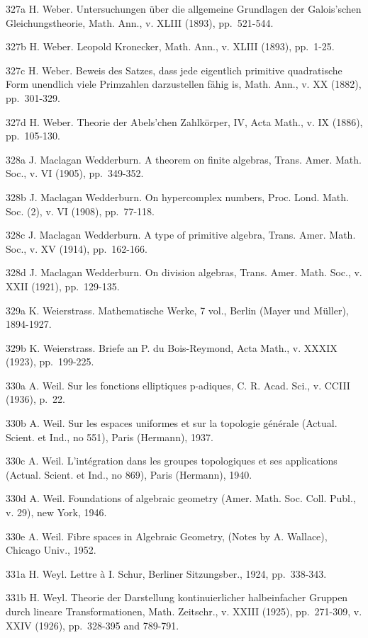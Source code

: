 327a H. Weber. Untersuchungen über die allgemeine Grundlagen der Galois'schen Gleichungstheorie, Math. Ann., v. XLIII (1893), pp.~521-544.

327b H. Weber. Leopold Kronecker, Math. Ann., v. XLIII (1893), pp.~1-25.

327c H. Weber. Beweis des Satzes, dass jede eigentlich primitive quadratische Form unendlich viele Primzahlen darzustellen fähig is, Math. Ann., v. XX (1882), pp.~301-329.

327d H. Weber. Theorie der Abels'chen Zahlkörper, IV, Acta Math., v. IX (1886), pp.~105-130.

328a J. Maclagan Wedderburn. A theorem on finite algebras, Trans. Amer. Math. Soc., v. VI (1905), pp.~349-352.

328b J. Maclagan Wedderburn. On hypercomplex numbers, Proc. Lond. Math. Soc. (2), v. VI (1908), pp.~77-118.

328c J. Maclagan Wedderburn. A type of primitive algebra, Trans. Amer. Math. Soc., v. XV (1914), pp.~162-166.

328d J. Maclagan Wedderburn. On division algebras, Trans. Amer. Math. Soc., v. XXII (1921), pp.~129-135.

329a K. Weierstrass. Mathematische Werke, 7 vol., Berlin (Mayer und Müller), 1894-1927.

329b K. Weierstrass. Briefe an P. du Bois-Reymond, Acta Math., v. XXXIX (1923), pp.~199-225.

330a A. Weil. Sur les fonctions elliptiques p-adiques, C. R. Acad. Sci., v. CCIII (1936), p.~22.

330b A. Weil. Sur les espaces uniformes et sur la topologie générale (Actual. Scient. et Ind., no 551), Paris (Hermann), 1937.

330c A. Weil. L'intégration dans les groupes topologiques et ses applications (Actual. Scient. et Ind., no 869), Paris (Hermann), 1940.

330d A. Weil. Foundations of algebraic geometry (Amer. Math. Soc. Coll. Publ., v. 29), new York, 1946.

330e A. Weil. Fibre spaces in Algebraic Geometry, (Notes by A. Wallace), Chicago Univ., 1952.

331a H. Weyl. Lettre à I. Schur, Berliner Sitzungsber., 1924, pp.~338-343.

331b H. Weyl. Theorie der Darstellung kontinuierlicher halbeinfacher Gruppen durch lineare Transformationen, Math. Zeitschr., v. XXIII (1925), pp.~271-309, v. XXIV (1926), pp.~328-395 and 789-791.

